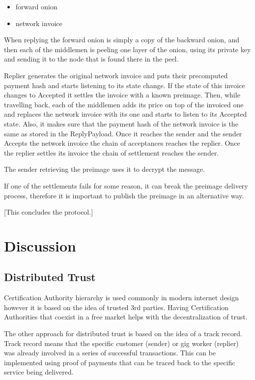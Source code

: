 \documentclass{article}
\begin{document}
\begin{itemize}
	\item  forward onion
	\item  network invoice
\end{itemize}

When replying the forward onion is simply a copy of the backward onion, and then each of the middlemen is peeling one layer of the onion, using its private key and sending it to the node that is found there in the peel.

Replier generates the original network invoice and puts their precomputed payment hash and starts listening to its state change. If the state of this invoice changes to Accepted it settles the invoice with a known preimage.
Then, while travelling back, each of the middlemen adds its price on top of the invoiced one and replaces the network invoice with its one and starts to listen to its Accepted state. Also, it makes sure that the payment hash of the network invoice is the same as stored in the ReplyPayload.
Once it reaches the sender and the sender Accepts the network invoice the chain of acceptances reaches the replier. Once the replier settles its invoice the chain of settlement reaches the sender.

The sender retrieving the preimage uses it to decrypt the message.

If one of the settlements fails for some reason, it can break the preimage delivery process, therefore it is important to publish the preimage in an alternative way.

[This concludes the protocol.]

\section{Discussion}

\subsection{Distributed Trust}

Certification Authority hierarchy is used commonly in modern internet design however it is based on the idea of trusted 3rd parties. Having Certification Authorities that coexist in a free market helps with the decentralization of trust.

The other approach for distributed trust is based on the idea of a track record. Track record means that the specific customer (sender) or gig worker (replier) was already involved in a series of successful transactions. This can be implemented using proof of payments that can be traced back to the specific service being delivered.
\end{document}
